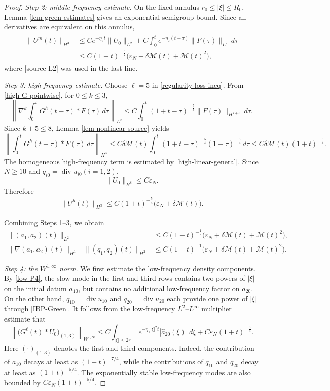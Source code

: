 \documentclass[10pt,reqno]{amsart}
\numberwithin{equation}{section}
\begin{document}
\begin{proof}
\medskip
\noindent\emph{Step 2: middle-frequency estimate.}
On the fixed annulus $r_0\le|\xi|\le R_0$, Lemma \ref{lem-green-estimates} gives an exponential semigroup bound.  Since all derivatives are equivalent on this annulus,
\begin{align}\label{middle-nonlinear}
\begin{aligned}
\|U^m(t)\|_{H^3} &\le Ce^{-\eta_2   t}\|U_0\|_{L^2} +C\int_0^te^{-\eta_2  (t-\tau)}\|F(\tau)\|_{L^2}\,d\tau \\
&\le C(1+t)^{-\frac{3}{2}} \big(\varepsilon_N+\delta\mathcal M(t)+\mathcal M(t)^2\big),
\end{aligned}
\end{align}
where \eqref{source-L2} was used in the last line.

\medskip
\noindent\emph{Step 3: high-frequency estimate.} Choose $\ell=5$ in \eqref{regularity-loss-ineq}.  From \eqref{high-G-pointwise}, for $0\le k\le3$,
\[ 
\left\|\nabla^k\int_0^tG^h(t-\tau)*F(\tau)\,d\tau\right\|_{L^2}
\le C\int_0^t(1+t-\tau)^{-\frac{5}{4}}\|F(\tau)\|_{H^{k+5}}\,d\tau.
\] 
Since $k+5\le8$, Lemma \ref{lem-nonlinear-source} yields
\[
\left\|\int_0^tG^h(t-\tau)*F(\tau)\,d\tau\right\|_{H^3} \le C\delta\mathcal M(t) \int_0^t(1+t-\tau)^{-\frac{5}{4}}(1+\tau)^{-\frac{5}{4}}\,d\tau \le C\delta\mathcal M(t)(1+t)^{-\frac{5}{4}}.
\]
The homogeneous high-frequency term is estimated by \eqref{high-linear-general}.  Since {$N\geq 10$} and $q_{i0}=\operatorname{div}u_{i0} (i=1,2)$,
\[
\|U_0\|_{H^8}\le C\varepsilon_N.
\]
Therefore
\begin{align}\label{high-nonlinear-final}
\|U^h(t)\|_{H^3}
\le C(1+t)^{-\frac{5}{4}}\big(\varepsilon_N+\delta\mathcal M(t)\big).
\end{align}


Combining Steps 1--3, we obtain
\begin{align}
\|(a_1,a_2)(t)\|_{L^2}
&\le C(1+t)^{-\frac12}\big(\varepsilon_N+\delta\mathcal M(t)+\mathcal M(t)^2\big),\label{T01}\\
\|\nabla(a_1,a_2)(t)\|_{H^1}
+\|(q_1,q_2)(t)\|_{H^2}
&\le C(1+t)^{-1}\big(\varepsilon_N+\delta\mathcal M(t)+\mathcal M(t)^2\big).\label{T02}
\end{align}


\medskip
\noindent\emph{Step 4: the $W^{1,\infty}$ norm.} We first estimate the low-frequency density components. By \eqref{low-P4}, the slow mode in the first and third rows contains two powers of $|\xi|$ on the initial datum $a_{10}$, but contains no additional low-frequency factor on $a_{20}$. On the other hand, $q_{10}=\operatorname{div}u_{10}$ and $q_{20}=\operatorname{div}u_{20}$ each provide one power of $|\xi|$ through \eqref{IBP-Green}. It follows from the low-frequency $L^2$--$L^\infty$ multiplier estimate that
\[
\left\| \bigl(G^\ell(t)*U_0\bigr)_{(1,3)} \right\|_{W^{1,\infty}} \le C\int_{|\xi|\le 2r_0} e^{-\eta_1 |\xi|^2t} |\widehat a_{20}(\xi)|\,d\xi +C\varepsilon_N(1+t)^{-\frac54}.
\]
Here $(\cdot)_{(1,3)}$ denotes the first and third components. Indeed, the contribution of $a_{10}$ decays at least as $(1+t)^{-7/4}$, while the contributions of $q_{10}$ and $q_{20}$ decay at least as $(1+t)^{-5/4}$. The exponentially stable low-frequency modes are also bounded by $C\varepsilon_N(1+t)^{-5/4}$.


\end{proof}
\end{document}
